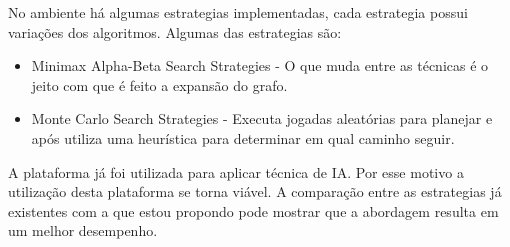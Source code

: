 No ambiente há algumas estrategias implementadas, cada estrategia possui variações dos algoritmos. Algumas das estrategias são:
\begin{itemize}
	\item Minimax Alpha-Beta Search Strategies - O que muda entre as técnicas é o jeito com que é feito a expansão do grafo.
	\item Monte Carlo Search Strategies - Executa jogadas aleatórias para planejar e após utiliza uma heurística para determinar em qual caminho seguir.
\end{itemize}

A plataforma já foi utilizada para aplicar técnica de IA. Por esse motivo a utilização desta plataforma se torna viável. A comparação entre as estrategias já existentes com a que estou propondo pode mostrar que a abordagem resulta em um melhor desempenho. 
